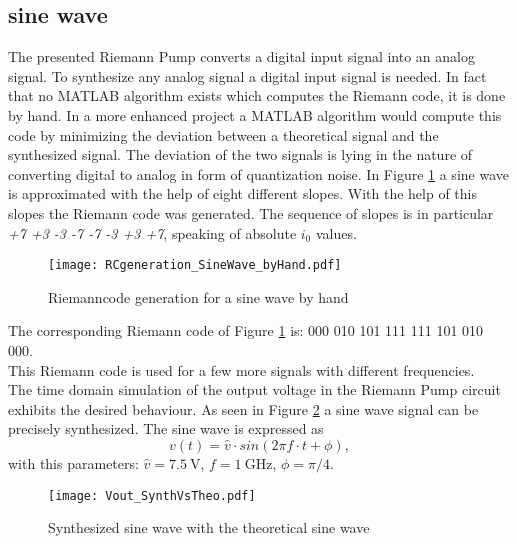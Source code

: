 \subsection{sine wave}
The presented Riemann Pump converts a digital input signal into an analog signal. 
To synthesize any analog signal a digital input signal is needed.  
In fact that no MATLAB algorithm exists which computes the Riemann code, it is done by hand. 
In a more enhanced project a MATLAB algorithm would compute this code by minimizing the deviation between a theoretical signal and the synthesized signal.
 The deviation of the two signals is lying in the nature of converting digital to analog in form of quantization noise. In Figure \ref{fig:SineWaveCodeGeneration} a sine wave is approximated with the help of eight different slopes. With the help of this slopes the Riemann code was generated. The sequence of slopes is in particular \textit{+7 +3 -3 -7 -7 -3 +3 +7}, speaking of absolute $i_0$ values.\\
 
 \begin{figure}[htb!]
   \centering
   \texttt{[image: RCgeneration\_SineWave\_byHand.pdf]}
   \caption{Riemanncode generation for a sine wave by hand}
   \label{fig:SineWaveCodeGeneration}
\end{figure}

The corresponding Riemann code of Figure \ref{fig:SineWaveCodeGeneration}  is: 000 010 101 111 111 101 010 000.
\\
This Riemann code is used for a few more signals with different frequencies.
\\
The time domain simulation of the output voltage in the Riemann Pump circuit exhibits the desired behaviour. 
As seen in Figure \ref{fig:SineWaveSynthVsTheoretical} a sine wave signal can be precisely synthesized. 
The sine wave is expressed as 
\begin{equation}
	v(t)= \widehat{v} \cdot sin( 2  \pi  f \cdot  t + \phi),
\end{equation}
with this parameters: $\widehat{v} = \SI{7.5}{\volt}$, $f = \SI{1}{\giga \hertz}$, $\phi = \pi / 4$.

\begin{figure}[htb!]
   \centering
   \texttt{[image: Vout\_SynthVsTheo.pdf]}
   \caption{Synthesized sine wave with the theoretical sine wave}
   \label{fig:SineWaveSynthVsTheoretical}
\end{figure}

